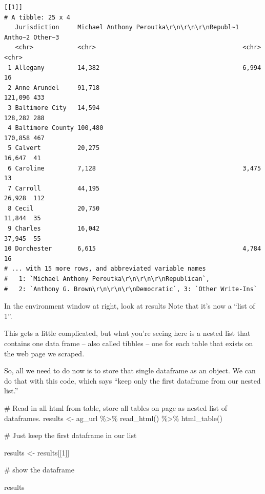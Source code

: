 \documentclass[
  letterpaper,
  DIV=11,
  numbers=noendperiod]{scrreprt}
\newenvironment{Shaded}{\begin{snugshade}}{\end{snugshade}}
\newcommand{\CommentTok}[1]{\textcolor[rgb]{0.37,0.37,0.37}{#1}}
\newcommand{\DecValTok}[1]{\textcolor[rgb]{0.68,0.00,0.00}{#1}}
\newcommand{\FunctionTok}[1]{\textcolor[rgb]{0.28,0.35,0.67}{#1}}
\newcommand{\NormalTok}[1]{\textcolor[rgb]{0.00,0.23,0.31}{#1}}
\newcommand{\OtherTok}[1]{\textcolor[rgb]{0.00,0.23,0.31}{#1}}
\newcommand{\SpecialCharTok}[1]{\textcolor[rgb]{0.37,0.37,0.37}{#1}}
\begin{document}
\begin{verbatim}
[[1]]
# A tibble: 25 x 4
   Jurisdiction     Michael Anthony Peroutka\r\n\r\n\r\nRepubl~1 Antho~2 Other~3
   <chr>            <chr>                                        <chr>   <chr>  
 1 Allegany         14,382                                       6,994   16     
 2 Anne Arundel     91,718                                       121,096 433    
 3 Baltimore City   14,594                                       128,282 288    
 4 Baltimore County 100,480                                      170,858 467    
 5 Calvert          20,275                                       16,647  41     
 6 Caroline         7,128                                        3,475   13     
 7 Carroll          44,195                                       26,928  112    
 8 Cecil            20,750                                       11,844  35     
 9 Charles          16,042                                       37,945  55     
10 Dorchester       6,615                                        4,784   16     
# ... with 15 more rows, and abbreviated variable names
#   1: `Michael Anthony Peroutka\r\n\r\n\r\nRepublican`,
#   2: `Anthony G. Brown\r\n\r\n\r\nDemocratic`, 3: `Other Write-Ins`
\end{verbatim}

In the environment window at right, look at results Note that it's now a
``list of 1''.

This gets a little complicated, but what you're seeing here is a nested
list that contains one data frame -- also called tibbles -- one for each
table that exists on the web page we scraped.

So, all we need to do now is to store that single dataframe as an
object. We can do that with this code, which says ``keep only the first
dataframe from our nested list.''

\begin{Shaded}
\begin{Highlighting}[]
\CommentTok{\# Read in all html from table, store all tables on page as nested list of dataframes.}
\NormalTok{results }\OtherTok{\textless{}{-}}\NormalTok{ ag\_url }\SpecialCharTok{\%\textgreater{}\%}
  \FunctionTok{read\_html}\NormalTok{() }\SpecialCharTok{\%\textgreater{}\%}
  \FunctionTok{html\_table}\NormalTok{()}

\CommentTok{\# Just keep the first dataframe in our list}

\NormalTok{results }\OtherTok{\textless{}{-}}\NormalTok{ results[[}\DecValTok{1}\NormalTok{]]}

\CommentTok{\# show the dataframe}

\NormalTok{results}
\end{Highlighting}
\end{Shaded}
\end{document}
